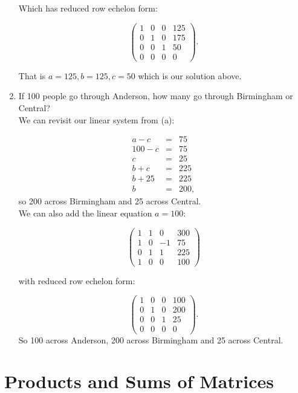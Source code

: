 \begin{example}
\begin{enumerate}
    Which has reduced row echelon form:
 
 $$ \left( \begin{array}{rrr|r}
1 & 0 & 0 & 125\\
0 & 1 & 0 & 175\\
0 & 0 & 1& 50\\
0 & 0 & 0& 0
\end{array}\right).$$   

That is $a=125, b=125, c=50$ which is our solution above.

\item If 100 people go through Anderson, how many go through Birmingham or Central?\\

We can revisit our linear system from (a):

    \begin{eqnarray*}
    a-c&=&75\\
    100-c&=&75\\
    c&=&25\\
    b+c&=&225\\
    b+25&=&225\\
    b&=&200,
    \end{eqnarray*}
so 200 across Birmingham and 25 across Central.\\

We can also add the linear equation $a=100$:

$$ \left( \begin{array}{rrr|r}
1 & 1 & 0& 300\\
1 & 0 & -1 & 75\\
0 & 1 & 1 & 225\\
1 & 0 & 0 & 100
\end{array}\right)$$

with reduced row echelon form:

$$ \left( \begin{array}{rrr|r}
1 & 0 & 0 & 100\\
0 & 1 & 0 & 200\\
0 & 0 & 1& 25\\
0 & 0 & 0& 0
\end{array}\right).$$  So 100 across Anderson, 200 across Birmingham and 25 across Central.
    
\end{enumerate}



\end{example}

\section{Products and Sums of Matrices}

